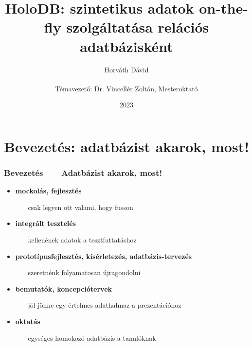 \documentclass[
]{beamer}
\title[HoloDB]{HoloDB: szintetikus adatok on-the-fly szolgáltatása relációs adatbázisként}
\author[Horváth Dávid]{Horváth Dávid \\ ~ \\ { \footnotesize Témavezető: Dr. Vincellér Zoltán, Mesteroktató }}
\institute[ELTE-IK]{ELTE Informatikai Kar, Információs Rendszerek Tanszék}
\date{2023}
\newcommand{\slidetitle}[2]{\frametitle{{\small #1 ~ \ding{226} ~ } \normalsize \textbf{#2} }}
\begin{document}
\beamertemplatenavigationsymbolsempty

\frame{\titlepage}


\section{Bevezetés: adatbázist akarok, most!}
\def\sectionshorttitle{Bevezetés}

\begin{frame}
    \slidetitle{\sectionshorttitle}{Adatbázist akarok, most!}
    
    
    \begin{itemize}
        \setlength\itemsep{0.7em}
        \item \textbf{mockolás, fejlesztés} \par
            ~~~ csak legyen ott valami, hogy fusson
        \item \textbf{integrált tesztelés} \par
            ~~~ kellenének adatok a tesztfuttatáshoz
        \item \textbf{prototípusfejlesztés, kísérletezés, adatbázis-tervezés} \par
            ~~~ szeretnénk folyamatosan újragondolni
        \item \textbf{bemutatók, koncepciótervek} \par
            ~~~ jól jönne egy értelmes adathalmaz a prezentációhoz
        \item \textbf{oktatás} \par
            ~~~ egységes homokozó adatbázis a tanulóknak
    \end{itemize}
\end{frame}
\end{document}
